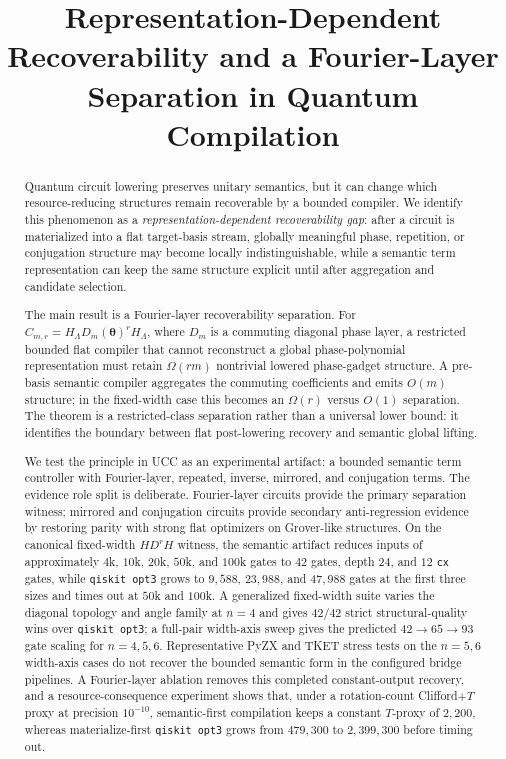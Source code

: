 \documentclass[11pt]{article}
\title{Representation-Dependent Recoverability and a Fourier-Layer Separation in Quantum Compilation}
\author{}
\date{}
\begin{document}
\maketitle

\begin{abstract}
Quantum circuit lowering preserves unitary semantics, but it can change which
resource-reducing structures remain recoverable by a bounded compiler. We
identify this phenomenon as a \emph{representation-dependent recoverability
gap}: after a circuit is materialized into a flat target-basis stream,
globally meaningful phase, repetition, or conjugation structure may become
locally indistinguishable, while a semantic term representation can keep the
same structure explicit until after aggregation and candidate selection.

The main result is a Fourier-layer recoverability separation. For
$C_{m,r}=H_{\Lambda}D_m(\boldsymbol{\theta})^rH_{\Lambda}$, where
$D_m$ is a commuting diagonal phase layer, a restricted bounded flat compiler
that cannot reconstruct a global phase-polynomial representation must retain
$\Omega(rm)$ nontrivial lowered phase-gadget structure. A pre-basis semantic
compiler aggregates the commuting coefficients and emits $O(m)$ structure; in
the fixed-width case this becomes an $\Omega(r)$ versus $O(1)$ separation. The
theorem is a restricted-class separation rather than a universal lower bound:
it identifies the boundary between flat post-lowering recovery and semantic
global lifting.

We test the principle in UCC as an experimental artifact: a bounded semantic
term controller with Fourier-layer, repeated, inverse, mirrored, and
conjugation terms. The evidence role split is deliberate. Fourier-layer circuits
provide the primary separation witness; mirrored and conjugation circuits
provide secondary anti-regression evidence by restoring parity with strong flat
optimizers on Grover-like structures. On the canonical fixed-width
$H D^r H$ witness, the semantic artifact reduces inputs of approximately
$4$k, $10$k, $20$k, $50$k, and $100$k gates to $42$ gates, depth $24$, and
$12$ \texttt{cx} gates, while \texttt{qiskit opt3} grows to $9{,}588$,
$23{,}988$, and $47{,}988$ gates at the first three sizes and times out at
$50$k and $100$k. A generalized fixed-width suite varies the diagonal topology
and angle family at $n=4$ and gives $42/42$ strict structural-quality wins over
\texttt{qiskit opt3}; a full-pair width-axis sweep gives the predicted
$42\!\to\!65\!\to\!93$ gate scaling for $n=4,5,6$. Representative PyZX and
TKET stress tests on the $n=5,6$ width-axis cases do not recover the bounded
semantic form in the configured bridge pipelines. A Fourier-layer ablation
removes this completed constant-output recovery, and a resource-consequence
experiment shows that, under a rotation-count Clifford+$T$ proxy at precision
$10^{-10}$, semantic-first compilation keeps a constant $T$-proxy of $2{,}200$,
whereas materialize-first \texttt{qiskit opt3} grows from $479{,}300$ to
$2{,}399{,}300$ before timing out.
\end{abstract}
\end{document}
